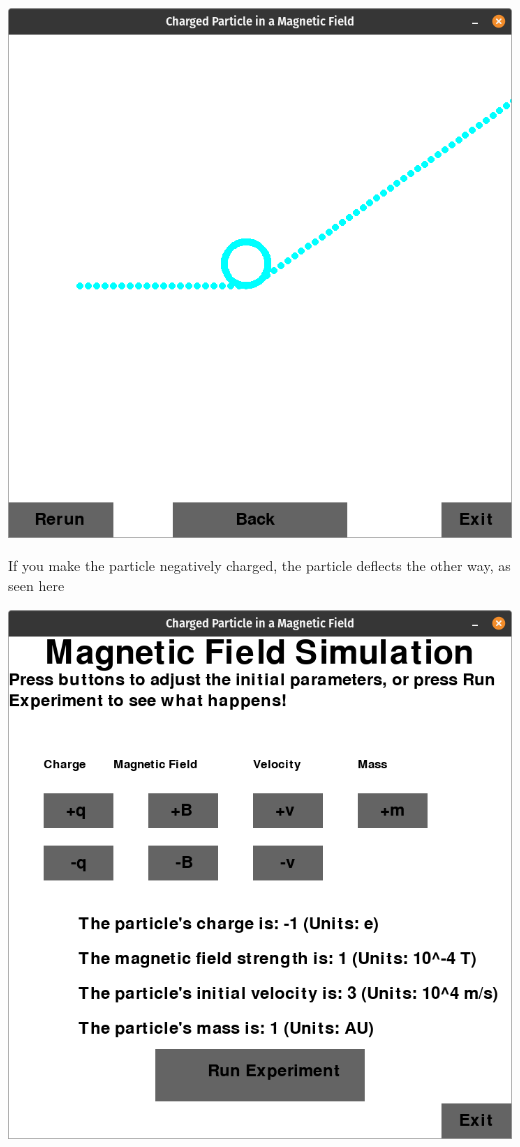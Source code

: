 \documentclass[11pt]{article}
\begin{document}
   			\includegraphics[scale=0.3]{4}
   			
   			If you make the particle negatively charged, the particle deflects the other way, as seen here
   			
   			\includegraphics[scale=0.3]{5}
   			
\end{document}
